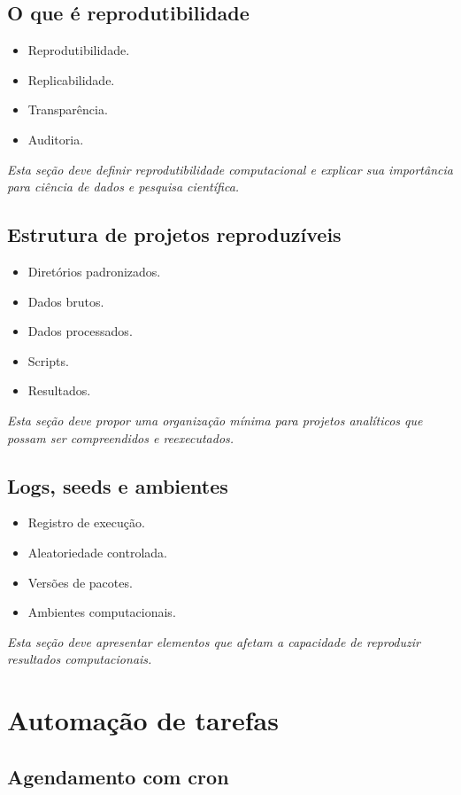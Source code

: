 \documentclass[12pt,openany]{book}
\newcommand{\placeholder}[1]{
    \par\medskip
    \noindent\textit{#1}
    \par\medskip
}
\newcommand{\topicos}[1]{
    \begin{itemize}
        #1
    \end{itemize}
}
\begin{document}
\begin{refsection}
\section{O que é reprodutibilidade}

\topicos{
    \item Reprodutibilidade.
    \item Replicabilidade.
    \item Transparência.
    \item Auditoria.
}

\placeholder{Esta seção deve definir reprodutibilidade computacional e explicar sua importância para ciência de dados e pesquisa científica.}

\section{Estrutura de projetos reproduzíveis}

\topicos{
    \item Diretórios padronizados.
    \item Dados brutos.
    \item Dados processados.
    \item Scripts.
    \item Resultados.
}

\placeholder{Esta seção deve propor uma organização mínima para projetos analíticos que possam ser compreendidos e reexecutados.}

\section{Logs, seeds e ambientes}

\topicos{
    \item Registro de execução.
    \item Aleatoriedade controlada.
    \item Versões de pacotes.
    \item Ambientes computacionais.
}

\placeholder{Esta seção deve apresentar elementos que afetam a capacidade de reproduzir resultados computacionais.}

\chapter{Automação de tarefas}

\section{Agendamento com cron}


\end{refsection}
\end{document}
